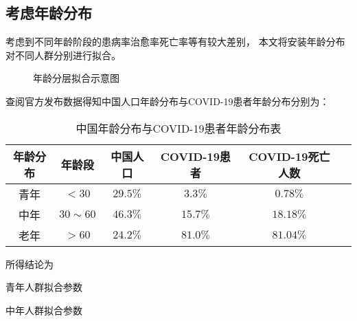 \subsection{考虑年龄分布}
\par 考虑到不同年龄阶段的患病率治愈率死亡率等有较大差别，
本文将安装年龄分布对不同人群分别进行拟合。
\begin{figure}[H]
    \centering
    \caption{年龄分层拟合示意图}
\end{figure}
\par 查阅官方发布数据得知中国人口年龄分布与COVID-19患者年龄分布分别为：
\begin{table}[H]
    \centering
    \caption{中国年龄分布与COVID-19患者年龄分布表}
    \begin{tabular}{cccccc}
        \hline
        年龄分布 & 年龄段      & 中国人口 & COVID-19患者 & COVID-19死亡人数   \\
        \hline
        青年     & $<30$       & $29.5\%$ & $3.3\%$      & $0.78\%$         & \\
        中年     & $30\sim 60$ & $46.3\%$ & $15.7\%$     & $18.18\%$        & \\
        老年     & $>60$       & $24.2\%$ & $81.0\%$     & $81.04\%$        & \\
        \hline
    \end{tabular}
\end{table}
\par 所得结论为
\begin{table}[H]
    \centering
    \caption{青年人群拟合参数}
    
\end{table}
\begin{table}[H]
    \centering
    \caption{中年人群拟合参数}
    
\end{table}
